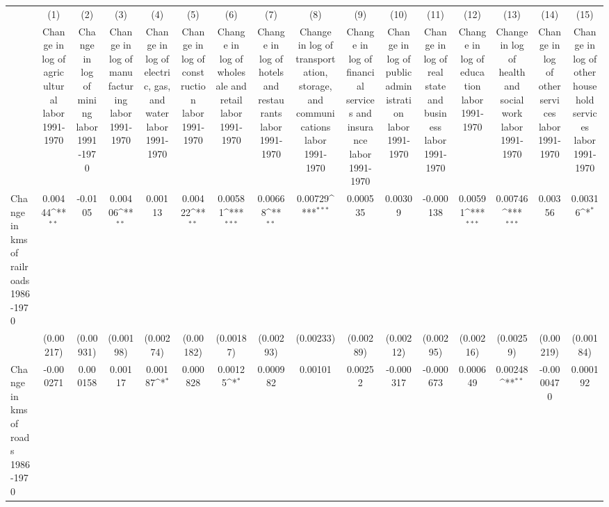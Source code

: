 {
\def\sym#1{\ifmmode^{#1}\else\(^{#1}\)\fi}
\begin{tabular}{l*{15}{c}}
\hline\hline
                &\multicolumn{1}{c}{(1)}&\multicolumn{1}{c}{(2)}&\multicolumn{1}{c}{(3)}&\multicolumn{1}{c}{(4)}&\multicolumn{1}{c}{(5)}&\multicolumn{1}{c}{(6)}&\multicolumn{1}{c}{(7)}&\multicolumn{1}{c}{(8)}&\multicolumn{1}{c}{(9)}&\multicolumn{1}{c}{(10)}&\multicolumn{1}{c}{(11)}&\multicolumn{1}{c}{(12)}&\multicolumn{1}{c}{(13)}&\multicolumn{1}{c}{(14)}&\multicolumn{1}{c}{(15)}\\
                &\multicolumn{1}{c}{Change in log of agricultural labor 1991-1970}&\multicolumn{1}{c}{Change in log of mining labor 1991-1970}&\multicolumn{1}{c}{Change in log of manufacturing labor 1991-1970}&\multicolumn{1}{c}{Change in log of electric, gas, and water labor 1991-1970}&\multicolumn{1}{c}{Change in log of construction labor 1991-1970}&\multicolumn{1}{c}{Change in log of wholesale and retail labor 1991-1970}&\multicolumn{1}{c}{Change in log of hotels and restaurants labor 1991-1970}&\multicolumn{1}{c}{Change in log of transportation, storage, and communications labor 1991-1970}&\multicolumn{1}{c}{Change in log of financial services and insurance labor 1991-1970}&\multicolumn{1}{c}{Change in log of public administration labor 1991-1970}&\multicolumn{1}{c}{Change in log of real state and business labor 1991-1970}&\multicolumn{1}{c}{Change in log of education labor 1991-1970}&\multicolumn{1}{c}{Change in log of health and social work labor 1991-1970}&\multicolumn{1}{c}{Change in log of other services labor 1991-1970}&\multicolumn{1}{c}{Change in log of other household services labor 1991-1970}\\
\hline
Change in kms of railroads 1986-1970&  0.00444\sym{**} &  -0.0105         &  0.00406\sym{**} &  0.00113         &  0.00422\sym{**} &  0.00581\sym{***}&  0.00668\sym{**} &  0.00729\sym{***}& 0.000535         &  0.00309         &-0.000138         &  0.00591\sym{***}&  0.00746\sym{***}&  0.00356         &  0.00316\sym{*}  \\
                &(0.00217)         &(0.00931)         &(0.00198)         &(0.00274)         &(0.00182)         &(0.00187)         &(0.00293)         &(0.00233)         &(0.00289)         &(0.00212)         &(0.00295)         &(0.00216)         &(0.00259)         &(0.00219)         &(0.00184)         \\
[1em]
Change in kms of roads 1986-1970&-0.000271         & 0.000158         &  0.00117         &  0.00187\sym{*}  & 0.000828         &  0.00125\sym{*}  & 0.000982         &  0.00101         &  0.00252         &-0.000317         &-0.000673         & 0.000649         &  0.00248\sym{**} &-0.0000470         & 0.000192         \\

\end{tabular}}
